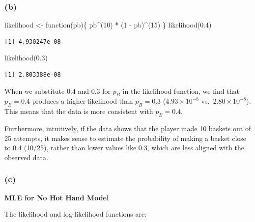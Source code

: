 \documentclass[
  letterpaper,
  DIV=11,
  numbers=noendperiod]{scrartcl}
\newenvironment{Shaded}{\begin{snugshade}}{\end{snugshade}}
\newcommand{\ControlFlowTok}[1]{\textcolor[rgb]{0.00,0.23,0.31}{#1}}
\newcommand{\DecValTok}[1]{\textcolor[rgb]{0.68,0.00,0.00}{#1}}
\newcommand{\FloatTok}[1]{\textcolor[rgb]{0.68,0.00,0.00}{#1}}
\newcommand{\FunctionTok}[1]{\textcolor[rgb]{0.28,0.35,0.67}{#1}}
\newcommand{\NormalTok}[1]{\textcolor[rgb]{0.00,0.23,0.31}{#1}}
\newcommand{\OtherTok}[1]{\textcolor[rgb]{0.00,0.23,0.31}{#1}}
\newcommand{\SpecialCharTok}[1]{\textcolor[rgb]{0.37,0.37,0.37}{#1}}
\begin{document}
\subsubsection{(b)}\label{b}

\begin{Shaded}
\begin{Highlighting}[]
\NormalTok{likelihood }\OtherTok{\textless{}{-}} \ControlFlowTok{function}\NormalTok{(pb)\{}
\NormalTok{  pb}\SpecialCharTok{\^{}}\NormalTok{(}\DecValTok{10}\NormalTok{) }\SpecialCharTok{*}\NormalTok{ (}\DecValTok{1} \SpecialCharTok{{-}}\NormalTok{ pb)}\SpecialCharTok{\^{}}\NormalTok{(}\DecValTok{15}\NormalTok{)}
\NormalTok{\}}
\FunctionTok{likelihood}\NormalTok{(}\FloatTok{0.4}\NormalTok{)}
\end{Highlighting}
\end{Shaded}

\begin{verbatim}
[1] 4.930247e-08
\end{verbatim}

\begin{Shaded}
\begin{Highlighting}[]
\FunctionTok{likelihood}\NormalTok{(}\FloatTok{0.3}\NormalTok{)}
\end{Highlighting}
\end{Shaded}

\begin{verbatim}
[1] 2.803388e-08
\end{verbatim}

When we substitute 0.4 and 0.3 for \(p_B\)\hspace{0pt} in the likelihood
function, we find that \(p_B=0.4\) produces a higher likelihood than
\(p_B=0.3\) (\(4.93 \times 10^{-8}\) vs.~\(2.80 \times 10^{-8}\)). This
means that the data is more consistent with \(p_B=0.4\).

Furthermore, intuitively, if the data shows that the player made 10
baskets out of 25 attempts, it makes sense to estimate the probability
of making a basket close to 0.4 (10/25), rather than lower values like
0.3, which are less aligned with the observed data.

\subsubsection{(c)}\label{c}

\textbf{MLE for No Hot Hand Model}

The likelihood and log-likelihood functions are:
\end{document}
